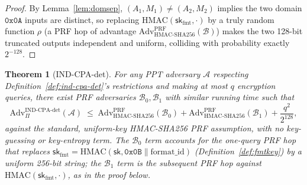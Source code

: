 \documentclass[11pt,a4paper]{article}
\newtheorem{theorem}{Theorem}[section]
\begin{document}
\begin{proof}
By Lemma~\ref{lem:domsep}, $(A_1,M_1)\neq(A_2,M_2)$ implies the two domain
$\texttt{0x0A}$ inputs are distinct, so replacing $\mathrm{HMAC}(\mathsf{sk}_{\mathrm{fmt}},\cdot)$
by a truly random function $\rho$ (a PRF hop of advantage
$\mathrm{Adv}^{\mathrm{PRF}}_{\mathrm{HMAC\text{-}SHA256}}(\mathcal{B})$)
makes the two 128-bit truncated outputs independent and uniform, colliding
with probability exactly $2^{-128}$.
\end{proof}

\begin{theorem}[IND-CPA-det]\label{thm:ind-cpa}
For any PPT adversary $\mathcal{A}$ respecting
Definition~\ref{def:ind-cpa-det}'s restrictions and making at most $q$
encryption queries, there exist PRF adversaries
$\mathcal{B}_0,\mathcal{B}_1$ with similar running time such that
\[
  \mathrm{Adv}^{\mathrm{IND\text{-}CPA\text{-}det}}_{\Pi}(\mathcal{A})
  \;\leq\;
  \mathrm{Adv}^{\mathrm{PRF}}_{\mathrm{HMAC\text{-}SHA256}}(\mathcal{B}_0)
  + \mathrm{Adv}^{\mathrm{PRF}}_{\mathrm{HMAC\text{-}SHA256}}(\mathcal{B}_1)
  + \frac{q^2}{2^{128}},
\]
against the standard, uniform-key HMAC-SHA256 PRF assumption, with no
key-guessing or key-entropy term. The $\mathcal{B}_0$ term accounts for
the one-query PRF hop that replaces
$\mathsf{sk}_{\mathrm{fmt}}=\mathrm{HMAC}(\mathsf{sk},\texttt{0x0B}\|\mathrm{format\_id})$
(Definition~\ref{def:fmtkey}) by a uniform 256-bit string; the
$\mathcal{B}_1$ term is the subsequent PRF hop against
$\mathrm{HMAC}(\mathsf{sk}_{\mathrm{fmt}},\cdot)$, as in the proof below.
\end{theorem}
\end{document}
